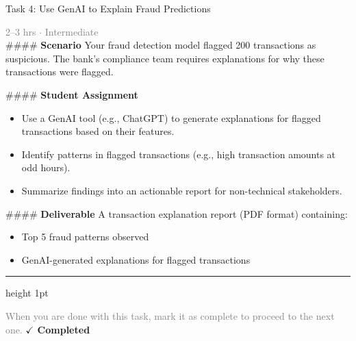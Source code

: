 \documentclass[10pt,a4paper]{article}
\begin{document}
\begin{taskbox}{Task 4: Use GenAI to Explain Fraud Predictions}

    {\small \textcolor{gray}{2--3 hrs $\cdot$ Intermediate}}\\[12pt]

    \#\#\#\# \textbf{Scenario}  
Your fraud detection model flagged 200 transactions as suspicious. The bank’s compliance team requires explanations for why these transactions were flagged.  

\#\#\#\# \textbf{Student Assignment}  
\begin{itemize}
    \item Use a GenAI tool (e.g., ChatGPT) to generate explanations for flagged transactions based on their features.  
    \item Identify patterns in flagged transactions (e.g., high transaction amounts at odd hours).  
    \item Summarize findings into an actionable report for non-technical stakeholders.  
\end{itemize}

\#\#\#\# \textbf{Deliverable}  
A transaction explanation report (PDF format) containing:  
\begin{itemize}
    \item Top 5 fraud patterns observed  
    \item GenAI-generated explanations for flagged transactions\par
\end{itemize}

    \vspace{16pt}

    \textcolor{cardBorder}{\hrule height 1pt}\vspace{8pt}

    \small \textcolor{gray}{When you are done with this task, mark it as complete to proceed to the next one.} \hfill \textbf{\textcolor{brandDark}{$\checkmark$ Completed}}

\end{taskbox}
\end{document}
